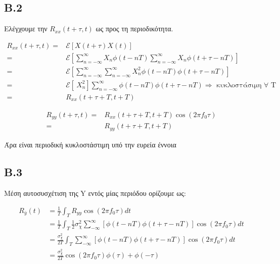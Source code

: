 \documentclass[11pt]{article}
\begin{document}
    \subsection*{B.2}
    Ελέγχουμε την $R_{xx}(t+\tau,t)$ ως προς τη περιοδικότητα.
    
    \begin{align*}
        R_{xx}(t+\tau,t) =& \mathcal{E}[X(t+\tau)X(t)] \\
        =& \mathcal{E}\left[\sum_{n=-\infty}^{\infty} X_n \phi(t-nT)\sum_{n=-\infty}^{\infty} X_n \phi(t+\tau-nT) \right] \\
        =& \mathcal{E}\left[\sum_{n=-\infty}^{\infty} \sum_{n=-\infty}^{\infty} X_n^2 \phi(t-nT) \phi(t+\tau-nT) \right] \\
        =& \mathcal{E}\left[\ X_n^2 \right] \sum_{n=-\infty}^{\infty}  \phi(t-nT) \phi(t+\tau-nT) \Rightarrow \mbox{ κυκλοστάσιμη } \forall \mbox{ T} \\
        =& R_{xx}(t+\tau+T,t+T)
    \end{align*}
    
    \begin{align*}
        R_{yy}(t+\tau,t) =& R_{xx}(t+\tau+T,t+T)\cos(2\pi f_0\tau) \\
        =& R_{yy}(t+\tau+T,t+T)
    \end{align*}
    \par \noindent
    Άρα είναι περιοδική κυκλοστάστιμη υπό την ευρεία έννοια
    
    \subsection*{B.3}
    Μέση αυτοσυσχέτιση της Y εντός μίας περιόδου ορίζουμε ως: 
    
    \begin{align*}
        R_{\bar{y}}(t) &= \frac{1}{T} \int_{T} R_{yy} \cos(2\pi f_0\tau) dt \\
        &= \frac{1}{T} \int_{T} \frac{1}{2} σ_χ^2 \sum_{-\infty}^{\infty} \left[ \phi(t-nT) \phi(t+\tau-nT) \right] \cos(2\pi f_0\tau) dt \\
        &= \frac{σ_χ^2}{2T}  \int_{T} \sum_{-\infty}^{\infty} \left[ \phi(t-nT) \phi(t+\tau-nT) \right] \cos(2\pi f_0\tau) dt \\
        &= \frac{σ_χ^2}{2T} \cos(2\pi f_0\tau) \phi(\tau) + \phi(-\tau) \\
    \end{align*}
    
\end{document}
